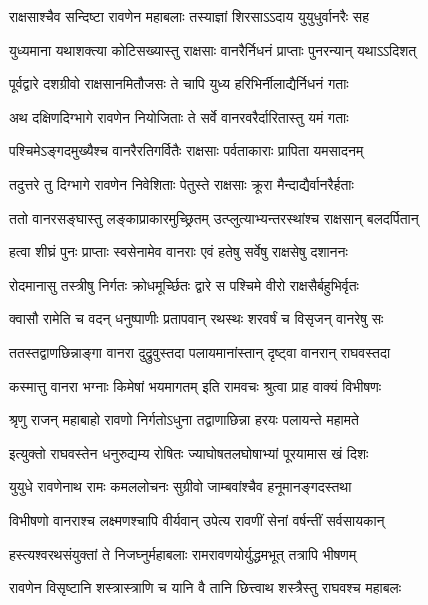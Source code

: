 \twolineshloka
{राक्षसाश्चैव सन्दिष्टा रावणेन महाबलाः}
{तस्याज्ञां शिरसाऽऽदाय युयुधुर्वानरैः सह} %

\twolineshloka
{युध्यमाना यथाशक्त्या कोटिसख्यास्तु राक्षसाः}
{वानरैर्निधनं प्राप्ताः पुनरन्यान् यथाऽऽदिशत्} %

\twolineshloka
{पूर्वद्वारे दशग्रीवो राक्षसानमितौजसः}
{ते चापि युध्य हरिभिर्नीलाद्यैर्निधनं गताः} %

\twolineshloka
{अथ दक्षिणदिग्भागे रावणेन नियोजिताः}
{ते सर्वे वानरवरैर्दारितास्तु यमं गताः} %

\twolineshloka
{पश्चिमेऽङ्गदमुख्यैश्च वानरैरतिगर्वितैः}
{राक्षसाः पर्वताकाराः प्रापिता यमसादनम्} %

\twolineshloka
{तदुत्तरे तु दिग्भागे रावणेन निवेशिताः}
{पेतुस्ते राक्षसाः क्रूरा मैन्दाद्यैर्वानरैर्हताः} %

\twolineshloka
{ततो वानरसङ्घास्तु लङ्काप्राकारमुच्छ्रितम्}
{उत्प्लुत्याभ्यन्तरस्थांश्च राक्षसान् बलदर्पितान्} %

\twolineshloka
{हत्वा शीघ्रं पुनः प्राप्ताः स्वसेनामेव वानराः}
{एवं हतेषु सर्वेषु राक्षसेषु दशाननः} %

\twolineshloka
{रोदमानासु तस्त्रीषु निर्गतः क्रोधमूर्च्छितः}
{द्वारे स पश्चिमे वीरो राक्षसैर्बहुभिर्वृतः} %

\twolineshloka
{क्वासौ रामेति च वदन् धनुष्पाणीः प्रतापवान्}
{रथस्थः शरवर्षं च विसृजन् वानरेषु सः} %

\twolineshloka
{ततस्तद्वाणछिन्नाङ्गा वानरा दुद्रुवुस्तदा}
{पलायमानांस्तान् दृष्ट्वा वानरान् राघवस्तदा} %

\twolineshloka
{कस्मात्तु वानरा भग्नाः किमेषां भयमागतम्}
{इति रामवचः श्रुत्वा प्राह वाक्यं विभीषणः} %

\twolineshloka
{श्रृणु राजन् महाबाहो रावणो निर्गतोऽधुना}
{तद्वाणाछिन्ना हरयः पलायन्ते महामते} %

\twolineshloka
{इत्युक्तो राघवस्तेन धनुरुद्यम्य रोषितः}
{ज्याघोषतलघोषाभ्यां पूरयामास खं दिशः} %

\twolineshloka
{युयुधे रावणेनाथ रामः कमललोचनः}
{सुग्रीवो जाम्बवांश्चैव हनूमानङ्गदस्तथा} %

\twolineshloka
{विभीषणो वानराश्च लक्ष्मणश्चापि वीर्यवान्}
{उपेत्य रावणीं सेनां वर्षन्तीं सर्वसायकान्} %

\twolineshloka
{हस्त्यश्वरथसंयुक्तां ते निजघ्नुर्महाबलाः}
{रामरावणयोर्युद्धमभूत् तत्रापि भीषणम्} %

\twolineshloka
{रावणेन विसृष्टानि शस्त्रास्त्राणि च यानि वै}
{तानि छित्त्वाथ शस्त्रैस्तु राघवश्च महाबलः} %

